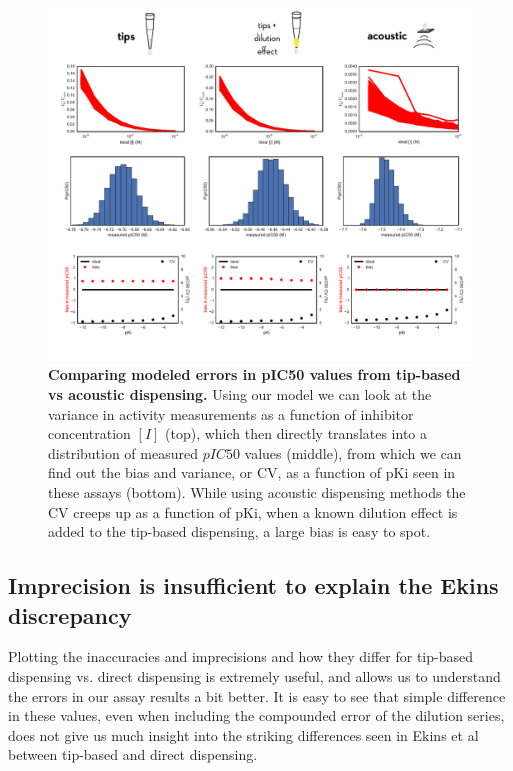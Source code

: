 \documentclass[aps,pre,twocolumn,nofootinbib,superscriptaddress,linenumbers]{revtex4-1}
\begin{document}
\begin{figure}[tb]
    \includegraphics[width=1.0\textwidth]{../figures/acoustic-vs-tips.pdf}

  \caption{{\bf Comparing modeled errors in pIC50 values from tip-based vs acoustic dispensing.}
  Using our model we can look at the variance in activity measurements as a function of inhibitor concentration $[I]$ (top), which then directly translates into a distribution of measured $pIC50$ values (middle), from which we can find out the bias and variance, or CV, as a function of pKi seen in these assays (bottom). While using acoustic dispensing methods the CV creeps up as a function of pKi, when a known dilution effect is added to the tip-based dispensing, a large bias is easy to spot.
  }
  \label{fig:acoustic-vs-tips}
\end{figure}

\subsection*{Imprecision is insufficient to explain the Ekins discrepancy}

Plotting the inaccuracies and imprecisions and how they differ for tip-based dispensing vs. direct dispensing is extremely useful, and allows us to understand the errors in our assay results a bit better. 
It is easy to see that simple difference in these values, even when including the compounded error of the dilution series, does not give us much insight into the striking differences seen in Ekins et al between tip-based and direct dispensing.
\end{document}
